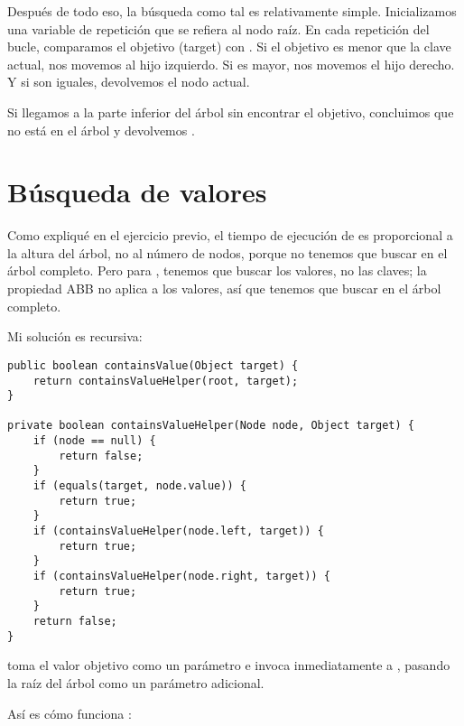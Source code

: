 \documentclass[12pt]{book}
\theoremstyle{exercise}
\begin{document}

Después de todo eso, la búsqueda como tal es relativamente simple. Inicializamos una
variable de repetición  que se refiera al nodo raíz. En cada repetición
del bucle, comparamos el objetivo (target) con . Si el objetivo
es menor que la clave actual, nos movemos al hijo izquierdo. Si es mayor, nos
movemos el hijo derecho. Y si son iguales, devolvemos el nodo actual.

Si llegamos a la parte inferior del árbol sin encontrar el objetivo,
concluimos que no está en el árbol y devolvemos .


\section{Búsqueda de valores}
\label{searching-for-values}

Como expliqué en el ejercicio previo, el tiempo de ejecución de
 es proporcional a la altura del árbol, no al
número de nodos, porque no tenemos que buscar en el árbol completo.
Pero para , tenemos que buscar los valores, no las claves;
la propiedad ABB no aplica a los valores, así que tenemos que buscar en el
árbol completo.


Mi solución es recursiva:

\begin{verbatim}
public boolean containsValue(Object target) {
    return containsValueHelper(root, target);
}

private boolean containsValueHelper(Node node, Object target) {
    if (node == null) {
        return false;
    }
    if (equals(target, node.value)) {
        return true;
    }
    if (containsValueHelper(node.left, target)) {
        return true;
    }
    if (containsValueHelper(node.right, target)) {
        return true;
    }
    return false;
}
\end{verbatim}

 toma el valor objetivo como un parámetro e
invoca inmediatamente a , pasando la raíz
del árbol como un parámetro adicional.


Así es cómo funciona :
\end{document}
